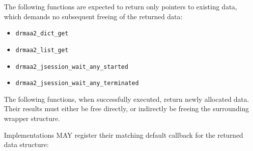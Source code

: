 \documentclass{article}
\newcommand{\h}[1]{\texttt{#1}}
\begin{document}
The following functions are expected to return only pointers to existing data, which demands no subsequent freeing of the returned data:

\begin{itemize}
	\item \h{drmaa2\_dict\_get}
	\item \h{drmaa2\_list\_get}
	\item \h{drmaa2\_jsession\_wait\_any\_started}
	\item \h{drmaa2\_jsession\_wait\_any\_terminated}
\end{itemize}

The following functions, when successfully executed, return newly allocated data. Their results must either be free directly, or indirectly be freeing the surrounding wrapper structure.

Implementations MAY register their matching default callback for the returned data structure:
\end{document}
